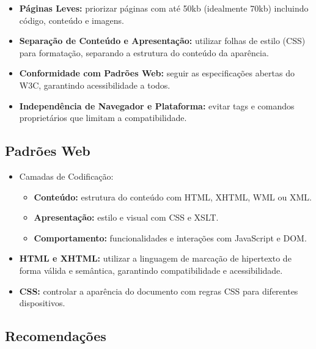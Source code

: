 \documentclass[
  12pt,
  openright,
  twoside,
  a4paper,
  english,
  french,
  spanish,
  brazil
]{abntex2}
\begin{document}
\begin{itemize}
  \item \textbf{Páginas Leves:} priorizar páginas com até 50kb (idealmente 70kb) incluindo código, conteúdo e imagens.
  \item \textbf{Separação de Conteúdo e Apresentação:} utilizar folhas de estilo (CSS) para formatação, separando a estrutura do conteúdo da aparência.
  \item \textbf{Conformidade com Padrões Web:} seguir as especificações abertas do W3C, garantindo acessibilidade a todos.
  \item \textbf{Independência de Navegador e Plataforma:} evitar tags e comandos proprietários que limitam a compatibilidade.
\end{itemize}

\subsection{Padrões Web}

\begin{itemize}
  \item Camadas de Codificação:
  \begin{itemize}
    \item \textbf{Conteúdo:} estrutura do conteúdo com HTML, XHTML, WML ou XML.
    \item \textbf{Apresentação:} estilo e visual com CSS e XSLT.
    \item \textbf{Comportamento:} funcionalidades e interações com JavaScript e DOM.
  \end{itemize}
  \item \textbf{HTML e XHTML:} utilizar a linguagem de marcação de hipertexto de forma válida e semântica, garantindo compatibilidade e acessibilidade.
  \item \textbf{CSS:} controlar a aparência do documento com regras CSS para diferentes dispositivos.
\end{itemize}

\subsection{Recomendações}
\end{document}
